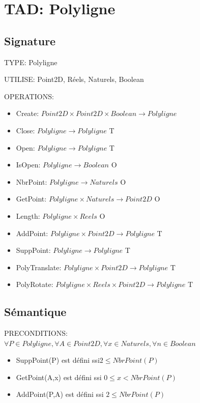 \documentclass[a4paper, 11pt, oneside]{article}
\begin{document}
\section{TAD: Polyligne}

\subsection{Signature}

\noindent TYPE: Polyligne

\noindent UTILISE: Point2D, Réels, Naturels, Boolean


\noindent OPERATIONS: 
\begin{itemize}
    \item Create: $Point2D \times Point2D \times Boolean \xrightarrow{} Polyligne$ 
    \item Close: $Polyligne \xrightarrow{} Polyligne$ {\color{green} T}
    \item Open: $Polyligne \xrightarrow{} Polyligne$ {\color{green} T}
    \item IsOpen: $Polyligne \xrightarrow{} Boolean$ {\color{green} O}
    \item NbrPoint: $Polyligne \xrightarrow{} Naturels$ {\color{green} O}
    \item GetPoint: $Polyligne \times Naturels \xrightarrow{} Point2D$ {\color{green} O}
    \item Length: $Polyligne \times Reels$ {\color{green} O}
    \item AddPoint: $Polyligne \times Point2D \xrightarrow{} Polyligne${\color{green} T}
    \item SuppPoint: $Polyligne \xrightarrow{} Polyligne$ {\color{green} T}
    \item PolyTranslate: $Polyligne \times Point2D \xrightarrow{} Polyligne$ {\color{green} T}
    \item PolyRotate: $Polyligne \times Reels \times Point2D \xrightarrow{} Polyligne$ {\color{green} T}
\end{itemize}

\bigskip

\subsection{Sémantique}

\noindent PRECONDITIONS: $\forall P \in Polyligne, \forall A \in Point2D, \forall x \in Naturels, \forall n \in Boolean$
\begin{itemize}
    \item SuppPoint(P) est défini ssi$2 \leq  NbrPoint(P)$
    \item GetPoint(A,x) est défini ssi $0 \leq x < NbrPoint(P)$
    \item AddPoint(P,A) est défini ssi  $ 2 \leq  NbrPoint(P)$
\end{itemize}
\end{document}
